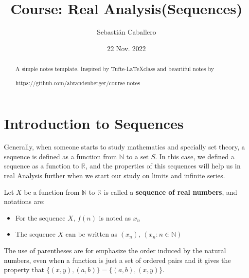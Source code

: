 \documentclass{tufte-handout}
\title{Course:  Real Analysis(Sequences)}
\author{Sebastián Caballero}
\date{22 Nov. 2022}
\begin{document}
\maketitle

\begin{abstract}
\noindent
A simple notes template. Inspired by Tufte-\LaTeX class and beautiful notes by \begin{verbatim*}
	https://github.com/abrandenberger/course-notes
\end{verbatim*}
\end{abstract}

\section{Introduction to Sequences}
Generally, when someone starts to study mathematics and specially set theory, a sequence is defined as a function from $\mathbb{N}$ to a set $S$. In this case, we defined a sequence as a function to $\mathbb{R}$, and the properties of this sequences will help us in real Analysis further when we start our study on limits and infinite series.

\begin{definition}
	Let $X$ be a function from $\mathbb{N}$ to $\mathbb{R}$ is called a \textbf{sequence of real numbers}, and notations are:
	\begin{itemize}
		\item For the sequence $X$, $f(n)$ is noted as $x_n$
		\item The sequence $X$ can be written as $(x_n)$, $(x_n: n \in \mathbb{N})$
	\end{itemize}
\end{definition}
The use of parentheses are for emphasize the order induced by the natural numbers, even when a function is just a set of ordered pairs and it gives the property that $\{(x, y), (a, b)\} = \{(a, b), (x, y)\}$. 
\end{document}
